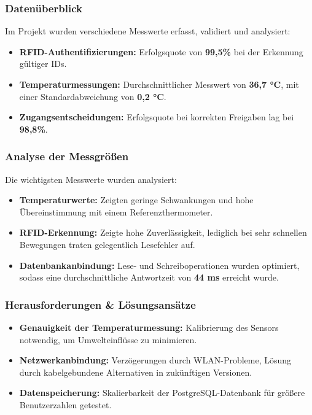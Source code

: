 \subsubsection{Datenüberblick}

Im Projekt wurden verschiedene Messwerte erfasst, validiert und analysiert:

\begin{itemize}
    \item \textbf{RFID-Authentifizierungen: }Erfolgsquote von \textbf{99,5\%} bei der Erkennung gültiger IDs.
    \item \textbf{Temperaturmessungen: }Durchschnittlicher Messwert von \textbf{36,7 °C}, mit einer Standardabweichung von \textbf{0,2 °C}.
    \item \textbf{Zugangsentscheidungen: }Erfolgsquote bei korrekten Freigaben lag bei \textbf{98,8\%}.
\end{itemize}

\subsubsection{Analyse der Messgrößen}

Die wichtigsten Messwerte wurden analysiert:

\begin{itemize}
    \item \textbf{Temperaturwerte: }Zeigten geringe Schwankungen und hohe Übereinstimmung mit einem Referenzthermometer.
    \item \textbf{RFID-Erkennung: }Zeigte hohe Zuverlässigkeit, lediglich bei sehr schnellen Bewegungen traten gelegentlich Lesefehler auf.
    \item \textbf{Datenbankanbindung: }Lese- und Schreiboperationen wurden optimiert, sodass eine durchschnittliche Antwortzeit von \textbf{44 ms} erreicht wurde.
\end{itemize}

\subsubsection{Herausforderungen \& Lösungsansätze}

\begin{itemize}
    \item \textbf{Genauigkeit der Temperaturmessung: }Kalibrierung des Sensors notwendig, um Umwelteinflüsse zu minimieren.
    \item \textbf{Netzwerkanbindung: }Verzögerungen durch WLAN-Probleme, Lösung durch kabelgebundene Alternativen in zukünftigen Versionen.
    \item \textbf{Datenspeicherung: }Skalierbarkeit der PostgreSQL-Datenbank für größere Benutzerzahlen getestet.
\end{itemize}
\clearpage

